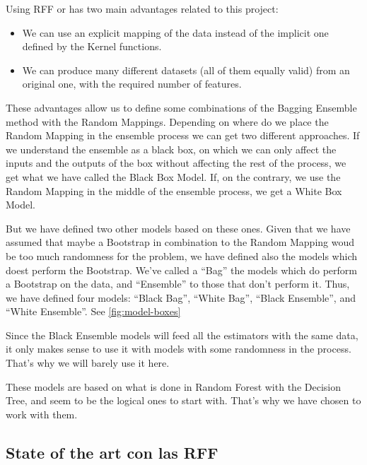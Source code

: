 \begin{pre-delivery}
  Using RFF or \Nys has two main advantages related to this project:
  \begin{itemize}
    \item We can use an explicit mapping of the data instead of the implicit
    one defined by the Kernel functions.
    \item We can produce many different datasets (all of them equally valid)
    from an original one, with the required number of features.
  \end{itemize}
  These advantages allow us to define some combinations of the Bagging
  Ensemble method with the Random Mappings. Depending on where do we place
  the Random Mapping in the ensemble process we can get two different approaches.
  If we understand the ensemble as a black box, on which we can only affect the
  inputs and the outputs of the box without affecting the rest of the process,
  we get what we have called the Black Box Model. If, on the contrary, we use
  the Random Mapping in the middle of the ensemble process, we get a White Box
  Model.

  But we have defined two other models based on these ones. Given that we have
  assumed that maybe a Bootstrap in combination to the Random Mapping woud be
  too much randomness for the problem, we have defined also the models which
  doest perform the Bootstrap. We've called a ``Bag'' the models which do
  perform a Bootstrap on the data, and ``Ensemble'' to those that don't
  perform it. Thus, we have defined four models: ``Black Bag'', ``White Bag'',
  ``Black Ensemble'', and ``White Ensemble''. See \ref{fig:model-boxes}


  Since the Black Ensemble models will feed all the estimators with the same
  data, it only makes sense to use it with models with some randomness in the
  process. That's why we will barely use it here.

  These models are based on what is done in Random Forest with the Decision
  Tree, and seem to be the logical ones to start with. That's why we have chosen
  to work with them.
\end{pre-delivery}
\BlackBoxes
\begin{note}
  \subsection{State of the art con las RFF}
\end{note}

